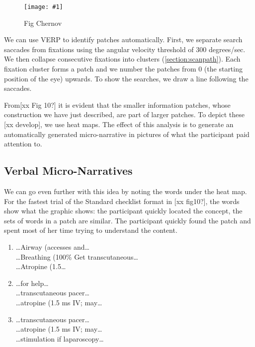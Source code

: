 \documentclass{sigchi}
\newcommand{\insertpicture}[2]{\begin{center}\texttt{[image: \#1]}\end{center}}
\begin{document}
\begin{figure}
	\insertpicture{figures/dummy.eps}{0.5}
	\caption{Fig Chernov\label{fig:chernov}} 
\end{figure} 

We can use VERP to identify patches automatically. First, we separate search saccades from fixations using the angular velocity threshold of 300 degrees/sec. We then collapse consecutive  fixations into clusters (\ref{section:scanpath}). Each 
fixation cluster  forms  a patch and we number   the patches from 0 
(the starting position of the eye) upwards. To show the searches, we 
draw a line following the saccades.

From[xx  Fig 10?] it is evident
that the smaller information patches, whose construction we have just
described, are part of larger patches. To depict these [xx develop], we use
heat maps. The effect of this analysis is to generate an automatically
generated micro-narrative in pictures of what the participant paid attention to. 


\subsection{Verbal Micro-Narratives} 
We can
go even further with this idea by noting the words under the heat map. For
the fastest trial of the Standard checklist format in [xx fig10?], the words show what the graphic
shows: the participant quickly located the concept, the sets of words in a
patch are similar. The participant quickly found the patch and spent most
of her time trying to understand the content. 

\begin{enumerate}
	\item \ldots Airway (accesses and\ldots  \\
		\ldots Breathing (100\% Get transcutaneous\ldots  \\
		\ldots Atropine (1.5\ldots  
	\item	\ldots for help\ldots  \\
	\ldots transcutaneous pacer\ldots  \\
	\ldots atropine (1.5 ms IV; may\ldots  \\
	\item  \ldots transcutaneous pacer\ldots  \\
		\ldots atropine (1.5 ms IV; may\ldots  \\
    \ldots stimulation if laparoscopy\ldots 
\end{enumerate}
\end{document}
